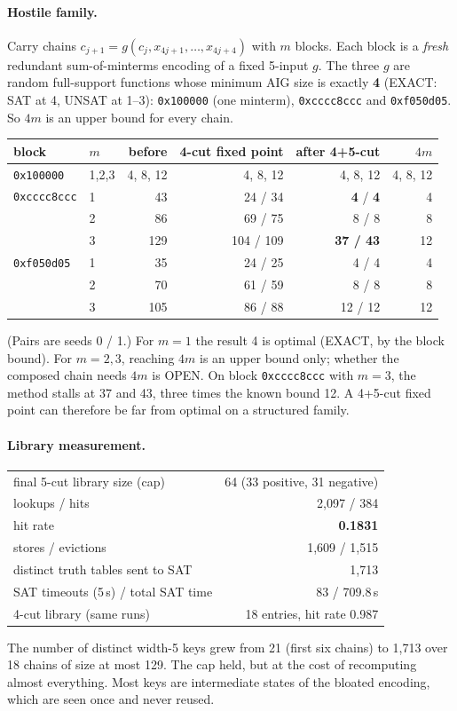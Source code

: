 \documentclass[11pt]{article}
\begin{document}
\paragraph{Hostile family.} Carry chains $c_{j+1}=g(c_j,x_{4j+1},\dots,x_{4j+4})$ with $m$ blocks. Each block is a \emph{fresh} redundant sum-of-minterms encoding of a fixed 5-input $g$. The three $g$ are random full-support functions whose minimum AIG size is exactly \textbf{4} (EXACT: SAT at 4, UNSAT at 1--3): \texttt{0x100000} (one minterm), \texttt{0xcccc8ccc} and \texttt{0xf050d05}. So $4m$ is an upper bound for every chain.
\begin{center}\begin{tabular}{llrrrr}\toprule
block & $m$ & before & 4-cut fixed point & after 4+5-cut & $4m$\\\midrule
\texttt{0x100000} & 1,2,3 & 4, 8, 12 & 4, 8, 12 & 4, 8, 12 & 4, 8, 12\\
\texttt{0xcccc8ccc} & 1 & 43 & 24 / 34 & \textbf{4} / \textbf{4} & 4\\
 & 2 & 86 & 69 / 75 & 8 / 8 & 8\\
 & 3 & 129 & 104 / 109 & \textbf{37 / 43} & 12\\
\texttt{0xf050d05} & 1 & 35 & 24 / 25 & 4 / 4 & 4\\
 & 2 & 70 & 61 / 59 & 8 / 8 & 8\\
 & 3 & 105 & 86 / 88 & 12 / 12 & 12\\\bottomrule
\end{tabular}\end{center}
(Pairs are seeds 0 / 1.) For $m=1$ the result 4 is optimal (EXACT, by the block bound). For $m=2,3$, reaching $4m$ is an upper bound only; whether the composed chain needs $4m$ is OPEN. On block \texttt{0xcccc8ccc} with $m=3$, the method stalls at 37 and 43, three times the known bound 12. A 4+5-cut fixed point can therefore be far from optimal on a structured family.

\paragraph{Library measurement.}
\begin{center}\begin{tabular}{lr}\toprule
final 5-cut library size (cap) & 64 (33 positive, 31 negative)\\
lookups / hits & 2{,}097 / 384\\
hit rate & \textbf{0.1831}\\
stores / evictions & 1{,}609 / 1{,}515\\
distinct truth tables sent to SAT & 1{,}713\\
SAT timeouts (5\,s) / total SAT time & 83 / 709.8\,s\\
4-cut library (same runs) & 18 entries, hit rate 0.987\\\bottomrule
\end{tabular}\end{center}
The number of distinct width-5 keys grew from 21 (first six chains) to 1{,}713 over 18 chains of size at most 129. The cap held, but at the cost of recomputing almost everything. Most keys are intermediate states of the bloated encoding, which are seen once and never reused.
\end{document}
